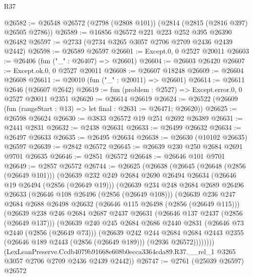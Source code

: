 \begin{lexlean}{R37}
\begin{coremodule}
@26582 := @26548 @26572 (@2798 (@2808 @101)) (@2814 (@2815 (@2816 @397) @26505 @2786))
@26589 := @16856 @26572 @221 @223 @252 @395 @26390 @26482
@26597 := @2733 (@2734 @3265 @3057 @2706 @2709 @2436 @2439 @2442)
@26598 := @26589 @26597
@26601 := Except.{0, 0} @2527 @20011
@26603 := @26406 (fun ("_" : @26407) => @26601)
@26604 := @26603 @26420
@26607 := Except.ok.{0, 0} @2527 @20011
@26608 := @26607 @18248
@26609 := @26604 @26608
@26611 := @20010 (fun ("_" : @20011) => @26601)
@26614 := @26611 @2646 (@26607 @2642)
@26619 := fun (problem : @2527) => Except.error.{0, 0} @2527 @20011 @2351
@26620 := @26614 @26619
@26624 := @26522 (@26609 (fun (rangeStart : @13) => let final : @2631 := @26471; @26620))
@26625 := @26598 @26624
@26630 := @3833 @26572 @19 @251 @2692 @26389
@26631 := @2441 @2831
@26632 := @2438 @26631
@26633 := @26499 @26632
@26634 := @26497 @26633
@26635 := @26495 @26634
@26638 := @26630 (@10102 @26635) @26597
@26639 := @2842 @26572
@26645 := @26639 @230 @250 @2684 @2691 @9701 @26635
@26646 := @2851 @26572
@26648 := @26646 @101 @9701
@26649 := @2857 @26572
@26744 := @26625
    (@26638
      (@26645
        (@26648 (@2856 (@26649 @101)))
        (@26639
          @232
          @249
          @2684
          @2690
          @26494
          @26634
          (@26646 @19 @26494 (@2856 (@26649 @19)))
          (@26639
            @234
            @248
            @2684
            @2689
            @26496
            @26633
            (@26646 @108 @26496 (@2856 (@26649 @108)))
            (@26639
              @236
              @247
              @2684
              @2688
              @26498
              @26632
              (@26646 @115 @26498 (@2856 (@26649 @115)))
              (@26639
                @238
                @246
                @2684
                @2687
                @2437
                @26631
                (@26646 @137 @2437 (@2856 (@26649 @137)))
                (@26639
                  @240
                  @245
                  @2684
                  @2686
                  @2440
                  @2831
                  (@26646 @73 @2440 (@2856 (@26649 @73)))
                  (@26639
                    @242
                    @244
                    @2684
                    @2684
                    @2443
                    @2355
                    (@26646 @189 @2443 (@2856 (@26649 @189)))
                    (@2936 @26572))))))))
      (LexLeanPreserve.Ccdb4079b91668e608b0ecca3364cda89.R37.__rel_1
        @3265
        @3057
        @2706
        @2709
        @2436
        @2439
        @2442))
@26747 := @2761 (@25039 @26597) @26572

\end{coremodule}
\end{lexlean}
